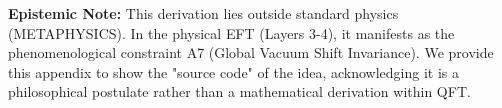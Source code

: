 \textbf{Epistemic Note:} This derivation lies outside standard physics (METAPHYSICS). In the physical EFT (Layers 3-4), it manifests as the phenomenological constraint A7 (Global Vacuum Shift Invariance). We provide this appendix to show the "source code" of the idea, acknowledging it is a philosophical postulate rather than a mathematical derivation within QFT.
